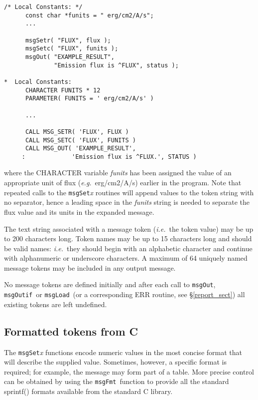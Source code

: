 \documentclass[twoside,11pt]{article}
\newcommand{\htmlref}[2]{#1}
\newcommand{\latex}[1]{#1}
\newcommand{\xlabel}[1]{}
\renewcommand{\_}{\texttt{\symbol{95}}}
\newcommand{\func}[1]{\texttt{#1}}
\newcommand{\farg}[1]{\textit{#1}}
\newcommand{\msgfmt}{\func{msgFmt}}
\newcommand{\msgload}{\func{msgLoad}}
\newcommand{\msgout}{\func{msgOut}}
\newcommand{\msgoutif}{\func{msgOutif}}
\begin{document}
\begin {small}
\begin{verbatim}
/* Local Constants: */
      const char *funits = " erg/cm2/A/s";
      ...

      msgSetr( "FLUX", flux );
      msgSetc( "FLUX", funits );
      msgOut( "EXAMPLE_RESULT",
              "Emission flux is ^FLUX", status );

*  Local Constants:
      CHARACTER FUNITS * 12
      PARAMETER( FUNITS = ' erg/cm2/A/s' )

      ...

      CALL MSG_SETR( 'FLUX', FLUX )
      CALL MSG_SETC( 'FLUX', FUNITS )
      CALL MSG_OUT( 'EXAMPLE_RESULT',
     :             'Emission flux is ^FLUX.', STATUS )
\end{verbatim}
\end {small}

where the CHARACTER variable \farg{funits} has been assigned the value of an
appropriate unit of flux (\textit{e.g.}\ erg/cm2/A/s) earlier in the program.
Note that repeated calls to the \func{msgSet}\textit{x} routines will append values
to the token string with no separator, hence a leading space in the \farg{funits}
string is needed to separate the flux value and its units in the expanded
message.

The text string associated with a message token (\textit{i.e.}\ the token value)
may be up to 200 characters long.
Token names may be up to 15 characters long and should be valid names:
\textit{i.e.}\ they should begin with an alphabetic character and continue with
alphanumeric or underscore characters.
A maximum of 64 uniquely named message tokens may be included in any output
message.

No message tokens are defined initially and
after each call to \msgout, \msgoutif\ or \msgload\ (or
\htmlref{a corresponding ERR
routine}{report_sect}\latex{, see \S\ref{report_sect}})
all existing tokens are left undefined.

\subsection{\xlabel{c_formatted_tokens}Formatted tokens from C}

The \func{msgSet}\textit{x} functions encode numeric values in the
most concise format that will describe the supplied value.
Sometimes, however, a specific format is required; for example, the message
may form part of a table.  More precise control can be obtained by
using the \msgfmt\ function to provide all the standard sprintf()
formats available from the standard C library.
\end{document}
